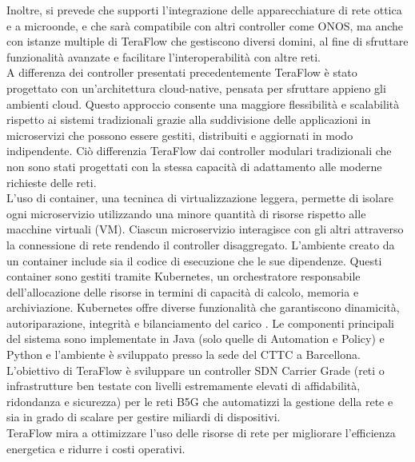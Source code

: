 Inoltre, si prevede che supporti l'integrazione delle 
apparecchiature di rete ottica e a microonde, e che sarà compatibile con altri controller come ONOS, ma anche con istanze multiple di TeraFlow che gestiscono diversi domini, al fine di sfruttare funzionalità avanzate e facilitare l'interoperabilità con altre reti.
\\A differenza dei controller presentati precedentemente TeraFlow è stato progettato con un'architettura cloud-native, pensata per sfruttare appieno gli ambienti cloud.
Questo approccio consente una maggiore flessibilità e scalabilità rispetto ai sistemi tradizionali grazie alla suddivisione delle applicazioni in microservizi che possono essere gestiti, distribuiti e aggiornati in modo indipendente.
Ciò differenzia TeraFlow dai controller modulari tradizionali che non sono stati progettati con la stessa capacità di adattamento alle moderne richieste delle reti.
\\L'uso di container, una tecninca di virtualizzazione leggera, permette di isolare ogni microservizio utilizzando una minore quantità di risorse rispetto alle macchine virtuali (VM).
Ciascun microservizio interagisce con gli altri attraverso la connessione di rete rendendo il controller disaggregato.
L'ambiente creato da un container include sia il codice di esecuzione che le sue dipendenze. %
Questi container sono gestiti tramite Kubernetes, un orchestratore responsabile dell'allocazione delle risorse in termini di capacità di calcolo, memoria e archiviazione\cite{arttfs}.
Kubernetes offre diverse funzionalità che garantiscono dinamicità, autoriparazione, integrità e bilanciamento del carico \cite{D53} \cite{D14}.
Le componenti principali del sistema sono implementate in Java (solo quelle di Automation e Policy) e Python e l'ambiente è sviluppato presso la sede del CTTC a Barcellona. 
\\L'obiettivo di TeraFlow è sviluppare un controller SDN Carrier Grade (reti o infrastrutture ben testate con livelli estremamente elevati di affidabilità, ridondanza e sicurezza) per le reti B5G che automatizzi la gestione della rete e sia in grado di scalare per gestire miliardi di dispositivi.
\\TeraFlow mira a ottimizzare l'uso delle risorse di rete per migliorare l'efficienza energetica e ridurre i costi operativi.

